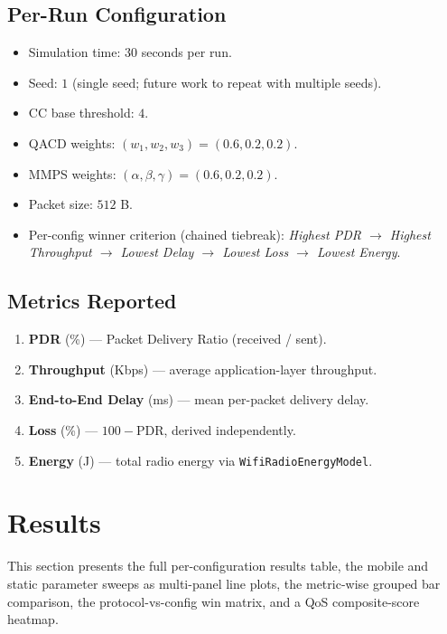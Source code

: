 \documentclass[11pt,a4paper]{article}
\begin{document}
\subsection{Per-Run Configuration}
\begin{itemize}
    \item Simulation time: $30$ seconds per run.
    \item Seed: $1$ (single seed; future work to repeat with multiple seeds).
    \item CC base threshold: $4$.
    \item QACD weights: $(w_1,w_2,w_3) = (0.6,0.2,0.2)$.
    \item MMPS weights: $(\alpha,\beta,\gamma) = (0.6,0.2,0.2)$.
    \item Packet size: $512$ B.
    \item Per-config winner criterion (chained tiebreak):
          \emph{Highest PDR $\to$ Highest Throughput $\to$ Lowest Delay $\to$
          Lowest Loss $\to$ Lowest Energy}.
\end{itemize}

\subsection{Metrics Reported}
\begin{enumerate}
    \item \textbf{PDR} (\%) — Packet Delivery Ratio (received / sent).
    \item \textbf{Throughput} (Kbps) — average application-layer throughput.
    \item \textbf{End-to-End Delay} (ms) — mean per-packet delivery delay.
    \item \textbf{Loss} (\%) — $100 - \text{PDR}$, derived independently.
    \item \textbf{Energy} (J) — total radio energy via
          \texttt{WifiRadioEnergyModel}.
\end{enumerate}

\section{Results}
\label{sec:results}

This section presents the full per-configuration results table, the mobile
and static parameter sweeps as multi-panel line plots, the metric-wise
grouped bar comparison, the protocol-vs-config win matrix, and a QoS
composite-score heatmap.
\end{document}
